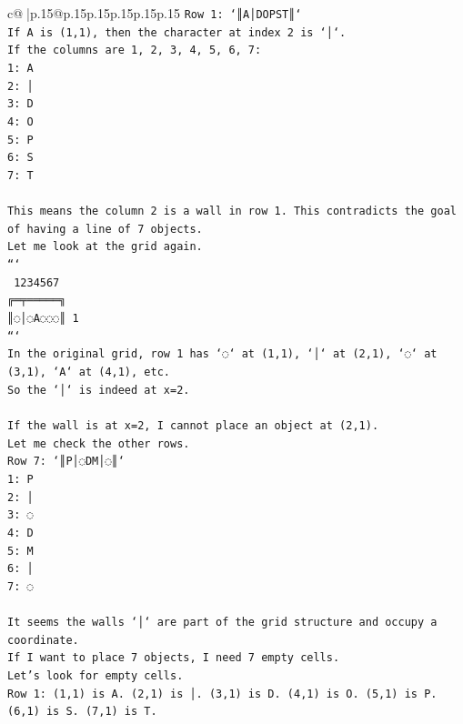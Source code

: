 \documentclass{article}
\begin{document}
{\begin{supertabular}{c@{$\;$}|p{.15\linewidth}@{}p{.15\linewidth}p{.15\linewidth}p{.15\linewidth}p{.15\linewidth}p{.15\linewidth}}
{{{\texttt{Row 1: `║A│DOPST║`} \\
\texttt{If A is (1,1), then the character at index 2 is `│`.} \\
\texttt{If the columns are 1, 2, 3, 4, 5, 6, 7:} \\
\texttt{1: A} \\
\texttt{2: │} \\
\texttt{3: D} \\
\texttt{4: O} \\
\texttt{5: P} \\
\texttt{6: S} \\
\texttt{7: T} \\
\\ 
\texttt{This means the column 2 is a wall in row 1. This contradicts the goal of having a line of 7 objects.} \\
\texttt{Let me look at the grid again.} \\
\texttt{```} \\
\texttt{ 1234567} \\
\texttt{╔═╤═════╗} \\
\texttt{║◌│◌A◌◌◌║ 1} \\
\texttt{```} \\
\texttt{In the original grid, row 1 has `◌` at (1,1), `│` at (2,1), `◌` at (3,1), `A` at (4,1), etc.} \\
\texttt{So the `│` is indeed at x=2.} \\
\\ 
\texttt{If the wall is at x=2, I cannot place an object at (2,1).} \\
\texttt{Let me check the other rows.} \\
\texttt{Row 7: `║P│◌DM│◌║`} \\
\texttt{1: P} \\
\texttt{2: │} \\
\texttt{3: ◌} \\
\texttt{4: D} \\
\texttt{5: M} \\
\texttt{6: │} \\
\texttt{7: ◌} \\
\\ 
\texttt{It seems the walls `│` are part of the grid structure and occupy a coordinate.} \\
\texttt{If I want to place 7 objects, I need 7 empty cells.} \\
\texttt{Let's look for empty cells.} \\
\texttt{Row 1: (1,1) is A. (2,1) is │. (3,1) is D. (4,1) is O. (5,1) is P. (6,1) is S. (7,1) is T.} \\
}}}
\end{supertabular}}
\end{document}
